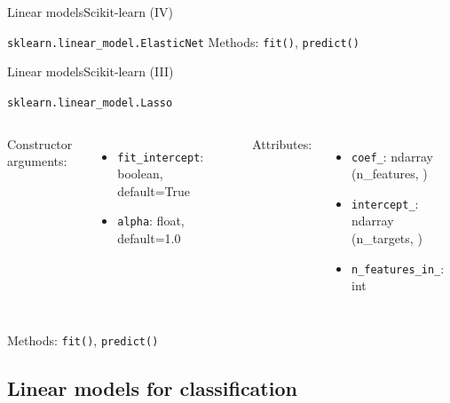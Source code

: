 \documentclass[10pt,compress]{beamer} %
\begin{document}
{\begin{frame}{Linear models}{Scikit-learn (IV)}
\begin{exampleblock}{\texttt{sklearn.linear\_model.ElasticNet}}
            Methods: \texttt{fit()}, \texttt{predict()}
        \end{exampleblock}

        \medskip

    \end{frame}

    \begin{frame}{Linear models}{Scikit-learn (III)}
        \begin{exampleblock}{\texttt{sklearn.linear\_model.Lasso}}
         \medskip

         \begin{columns}[T]
                Constructor arguments:
                \begin{itemize}
                    \item \texttt{fit\_intercept}: boolean, default=True
                    \item \texttt{alpha}: float, default=1.0
                \end{itemize}

                Attributes:
                \begin{itemize}
                    \item \texttt{coef\_}:  ndarray (n\_features, )
                    \item \texttt{intercept\_}:  ndarray (n\_targets, )
                    \item \texttt{n\_features\_in\_}: int
                \end{itemize}
            \end{columns}

            \medskip

            Methods: \texttt{fit()}, \texttt{predict()}
        \end{exampleblock}

        \medskip

    \end{frame}



}{}



\subsection{Linear models for classification}
\end{document}
